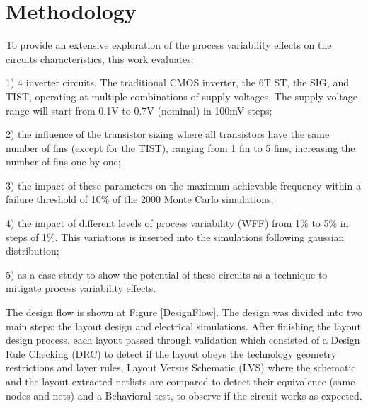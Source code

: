 \documentclass[diss,pgmicro,english]{iiufrgs}
\begin{document}

\chapter{Methodology}

To provide an extensive exploration of the process variability effects on the circuits characteristics, this work evaluates:

1) 4 inverter circuits. The traditional CMOS inverter, the 6T ST, the SIG, and TIST, operating at multiple combinations of supply voltages. The supply voltage range will start from 0.1V to 0.7V (nominal) in 100mV steps;

2) the influence of the transistor sizing where all transistors have the same number of fins (except for the TIST), ranging from 1 fin to 5 fins, increasing the number of fins one-by-one;

3) the impact of these parameters on the maximum achievable frequency within a failure threshold of 10\% of the 2000 Monte Carlo simulations;

4) the impact of different levels of process variability (WFF) from 1\% to 5\% in steps of 1\%. This variations is inserted into the simulations following gaussian distribution;

5) as a case-study to show the potential of these circuits as a technique to mitigate process variability effects.

The design flow is shown at Figure \ref{DesignFlow}. The design was divided into two main steps: the layout design and electrical simulations. After finishing the layout design process, each layout passed through validation which consisted of a Design Rule Checking (DRC) to detect if the layout obeys the technology geometry restrictions and layer rules, Layout Versus Schematic (LVS) where the schematic and the layout extracted netlists are compared to detect their equivalence (same nodes and nets) and a Behavioral test, to observe if the circuit works as expected.
\end{document}
